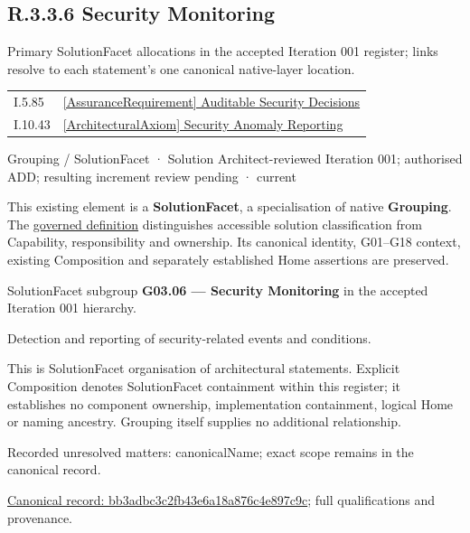 \subsection*{R.3.3.6 Security Monitoring}
\label{navigation:R.3.3.6}

Primary SolutionFacet allocations in the accepted Iteration 001 register; links resolve to each statement’s one canonical native-layer location.\par
\begin{longtable}{p{.22\linewidth}p{.73\linewidth}}
I.5.85 & \hyperref[element:92ef574eb9b945dfaf6cf2b1b670595b]{[AssuranceRequirement] Auditable Security Decisions} \\
I.10.43 & \hyperref[element:859f884874094c96a6ace15e17131a4c]{[ArchitecturalAxiom] Security Anomaly Reporting} \\
\end{longtable}
\label{element:bb3adbc3c2fb43e6a18a876c4e897c9c}
{\small Grouping / SolutionFacet · Solution Architect-reviewed Iteration 001; authorised ADD; resulting increment review pending · current}\par

This existing element is a \textbf{SolutionFacet}, a specialisation of native
\textbf{Grouping}. The \href{\detokenize{../../../../../../../governance/continuum-representation.md#solutionfacet-classification--1119-candidate}}{governed definition}
distinguishes accessible solution classification from Capability, responsibility
and ownership. Its canonical identity, G01–G18 context, existing Composition
and separately established Home assertions are preserved.



SolutionFacet subgroup \textbf{G03.06 — Security Monitoring} in the accepted Iteration 001 hierarchy.



Detection and reporting of security-related events and conditions.



This is SolutionFacet organisation of architectural statements. Explicit Composition denotes SolutionFacet containment within this register; it establishes no component ownership, implementation containment, logical Home or naming ancestry. Grouping itself supplies no additional relationship.


{\small Recorded unresolved matters: canonicalName; exact scope remains in the canonical record.}\par
{\footnotesize \href{../../../../../../../continuum/grouping/bb3adbc3c2fb43e6a18a876c4e897c9c.md}{Canonical record: bb3adbc3c2fb43e6a18a876c4e897c9c}; full qualifications and provenance.}\par
